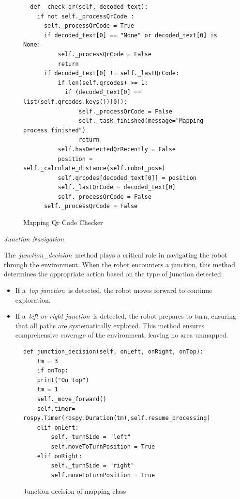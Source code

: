\documentclass[a4paper,12pt]{extreport}
\begin{document}
\begin{figure}
  \begin{verbatim}
  def _check_qr(self, decoded_text):
    if not self._processQrCode :
      self._processQrCode = True
      if decoded_text[0] == "None" or decoded_text[0] is None:
          self._processQrCode = False
          return 
      if decoded_text[0] != self._lastQrCode:
          if len(self.qrcodes) >= 1:
            if (decoded_text[0] == list(self.qrcodes.keys())[0]):
                self._processQrCode = False
                self._task_finished(message="Mapping process finished")
                return     
          self.hasDetectedQrRecently = False
          position = self._calculate_distance(self.robot_pose)
          self.qrcodes[decoded_text[0]] = position
          self._lastQrCode = decoded_text[0]
          self._processQrCode = False
      self._processQrCode = False

\end{verbatim}
\caption{Mapping Qr Code Checker}
\end{figure}

\emph{Junction Navigation}

The~\emph{junction\_decision}~method plays a critical role in navigating
the robot through the environment. When the robot encounters a junction,
this method determines the appropriate action based on the type of
junction detected:

\begin{itemize}
\item
  If a~\emph{top junction}~is detected, the robot moves forward to
  continue exploration.
\item
  If a~\emph{left or right junction}~is detected, the robot prepares to
  turn, ensuring that all paths are systematically explored. This method
  ensures comprehensive coverage of the environment, leaving no area
  unmapped.
\end{itemize}

\begin{figure}
  \begin{verbatim}
def junction_decision(self, onLeft, onRight, onTop):
    tm = 3
    if onTop:
    print("On top")
    tm = 1
    self._move_forward()
    self.timer= rospy.Timer(rospy.Duration(tm),self.resume_processing)
    elif onLeft:
        self._turnSide = "left"
        self.moveToTurnPosition = True
    elif onRight:
        self._turnSide = "right"
        self.moveToTurnPosition = True

\end{verbatim}
\caption{Junction decision of mapping class}
\end{figure}
\end{document}
